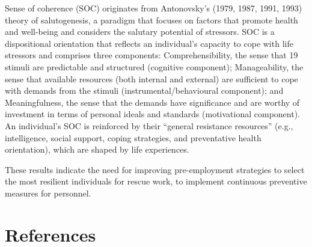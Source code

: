 \documentclass[
  man]{apa7}
\begin{document}
Sense of coherence (SOC) originates from Antonovsky's (1979,
1987, 1991, 1993) theory of salutogenesis, a paradigm that focuses
on factors that promote health and well-being and considers the
salutary potential of stressors. SOC is a dispositional orientation that
reflects an individual's capacity to cope with life stressors and
comprises three components: Comprehensibility, the sense that
19
stimuli are predictable and structured (cognitive component);
Manageability, the sense that available resources (both internal and
external) are sufficient to cope with demands from the stimuli
(instrumental/behavioural component); and Meaningfulness, the
sense that the demands have significance and are worthy of
investment in terms of personal ideals and standards (motivational
component). An individual's SOC is reinforced by their ``general
resistance resources'' (e.g., intelligence, social support, coping
strategies, and preventative health orientation), which are shaped by
life experiences.

These results indicate the need for improving pre-employment strategies to select the most resilient individuals for rescue work, to implement continuous preventive measures for personnel.

\newpage

\hypertarget{references}{%
\section{References}\label{references}}
\end{document}
